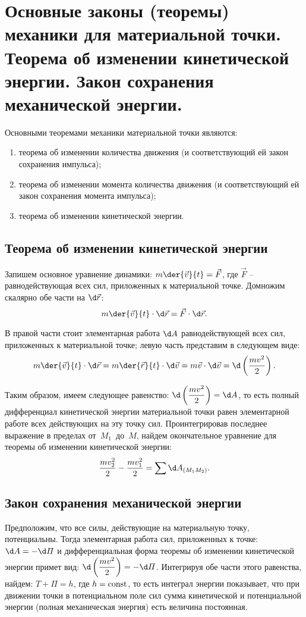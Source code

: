 \chapter{Основные законы (теоремы) механики для материальной точки. Теорема об
изменении кинетической энергии. Закон сохранения механической энергии.}

Основными теоремами механики материальной точки являются:
\begin{enumerate}
    \item теорема об изменении количества движения (и соответствующий ей закон
    сохранения импульса);
    \item теорема об изменении момента количества движения (и соответствующий ей
    закон сохранения момента импульса);
    \item теорема об изменении кинетической энергии.
\end{enumerate}

\section{Теорема об изменении кинетической энергии}

Запишем основное уравнение динамики: \( \ds m\der{\vec{v}}{t} = \vec{F} \), где
\( \vec{F} \) -- равнодействующая всех сил, приложенных к материальной точке.
Домножим скалярно обе части на \( \d\vec{r} \):
\[
    m\der{\vec{v}}{t}\cdot\d\vec{r} = \vec{F}\cdot\d\vec{r}.
\]

В правой части стоит элементарная работа \( \d A \) равнодействующей всех сил,
приложенных к материальной точке; левую часть представим в следующем виде:
\[
    m\der{\vec{v}}{t}\cdot\d\vec{r} = m\der{\vec{r}}{t}\cdot\d\vec{v} = m\vec{v}
    \cdot\d\vec{v} = \d\left(\frac{mv^2}{2}\right).
\]

Таким образом, имеем следующее равенство:
\( \ds \d\left(\frac{mv^2}{2}\right) = \d A\), то есть полный дифференциал
кинетической энергии материальной точки равен элементарной работе всех
действующих на эту точку сил. Проинтегрировав последнее выражение в пределах
от~\( M_1 \)~до~\( M \), найдем окончательное уравнение для теоремы об изменении
кинетической энергии:
\[
    \frac{mv_2^2}{2} - \frac{mv_1^2}{2} = \sum \d A_{(M_1M_2)}.
\]

\section{Закон сохранения механической энергии}

Предположим, что все силы, действующие на материальную точку, потенциальны.
Тогда элементарная работа сил, приложенных к точке: \( \d A = -\d\varPi \) и
дифференциальная форма теоремы об изменении кинетической энергии примет вид:
\( \ds \d\left(\frac{mv^2}{2}\right) = -\d\varPi \). Интегрируя обе части этого
равенства, найдем: \( T + \varPi = h \), где \( h = \mathrm{const} \), то есть интеграл
энергии показывает, что при движении точки в потенциальном поле сил сумма
кинетической и потенциальной энергии (полная механическая энергия) есть величина
постоянная.

\newpage
